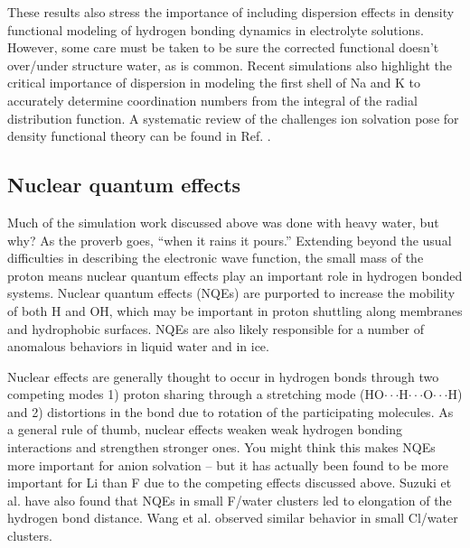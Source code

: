 \begin{intro}
   These results also stress the importance of including dispersion effects in density functional modeling of hydrogen bonding dynamics in electrolyte 
   solutions\cite{bankura2013hydration,bankura2015systematic}. However, some care must be taken to be sure the corrected functional doesn't over/under structure water, as is common.
   Recent simulations also highlight the critical importance of dispersion in modeling the first shell of Na\sur{+} and K\sur{+} to accurately determine coordination numbers from the 
   integral of the radial distribution function\cite{bankura2014hydration}. A systematic review of the challenges ion solvation pose for density functional theory can be found in 
   Ref. \cite{soniat2015dispersion}.
   
  \subsection{\label{ch1:sec3:level4}Nuclear quantum effects}
   Much of the simulation work discussed above was done with heavy water, but why? As the proverb goes, ``when it rains it pours.'' Extending beyond the usual difficulties in 
   describing the electronic wave function, the small mass of the proton means nuclear quantum effects play an important role in hydrogen bonded systems.
   Nuclear quantum effects (NQEs) are purported to increase the mobility of both H\sur{+}\cite{marx2000solvated} and OH\sur{-}\cite{tuckerman2002nature}, which may be important in
   proton shuttling along membranes and hydrophobic surfaces\cite{zhang2012water}. NQEs are also likely responsible for a number of anomalous behaviors in liquid water and in 
   ice\cite{pamuk2012anomalous}. 
   
   Nuclear effects are generally thought to occur in hydrogen bonds through two competing modes 1) proton sharing through a stretching mode
   (HO$\cdot\cdot\cdot$H$\cdot\cdot\cdot$O$\cdot\cdot\cdot$H) and 2) distortions in the bond due to rotation of the participating molecules\cite{ceriotti2016nuclear}.
   As a general rule of thumb, nuclear effects weaken weak hydrogen bonding interactions and strengthen stronger ones\cite{ceriotti2016nuclear,guo2016nuclear}. You might think this 
   makes NQEs more important for anion solvation -- but it has actually been found to be more important for Li\sur{+} than F\sur{-} due to the competing effects discussed 
   above\cite{wilkins2015nuclear}. Suzuki et al. have also found that NQEs in small F\sur{-}/water clusters led to elongation of the hydrogen bond distance\cite{kawashima2013ab}. 
   Wang et al. observed similar behavior in small Cl\sur{-}/water clusters.
   

\end{intro}
